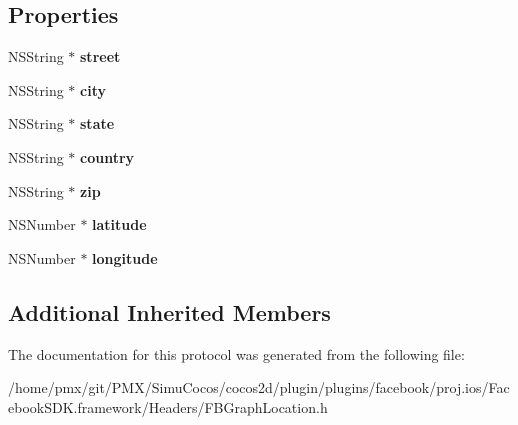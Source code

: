 \subsection*{Properties}
\begin{DoxyCompactItemize}
\item 
\mbox{\label{protocolFBGraphLocation-p_acc0809f85cecb084f3bdb6108a68fbbe}} 
N\+S\+String $\ast$ {\bfseries street}
\item 
\mbox{\label{protocolFBGraphLocation-p_ae0dec35c7198e2acafce3579ea0cefcc}} 
N\+S\+String $\ast$ {\bfseries city}
\item 
\mbox{\label{protocolFBGraphLocation-p_a6d5a21023bc06887bb8ac2ef12fee0be}} 
N\+S\+String $\ast$ {\bfseries state}
\item 
\mbox{\label{protocolFBGraphLocation-p_ac57e98d73164661b1b05ca73083225ab}} 
N\+S\+String $\ast$ {\bfseries country}
\item 
\mbox{\label{protocolFBGraphLocation-p_acdee37fcbda9659e021a0566f1570729}} 
N\+S\+String $\ast$ {\bfseries zip}
\item 
\mbox{\label{protocolFBGraphLocation-p_a9f1ce0958f2c4df0dcbb75d6202981d9}} 
N\+S\+Number $\ast$ {\bfseries latitude}
\item 
\mbox{\label{protocolFBGraphLocation-p_a65648fcb899012a1759b8b597614fb14}} 
N\+S\+Number $\ast$ {\bfseries longitude}
\end{DoxyCompactItemize}
\subsection*{Additional Inherited Members}


The documentation for this protocol was generated from the following file\+:\begin{DoxyCompactItemize}
\item 
/home/pmx/git/\+P\+M\+X/\+Simu\+Cocos/cocos2d/plugin/plugins/facebook/proj.\+ios/\+Facebook\+S\+D\+K.\+framework/\+Headers/F\+B\+Graph\+Location.\+h\end{DoxyCompactItemize}
